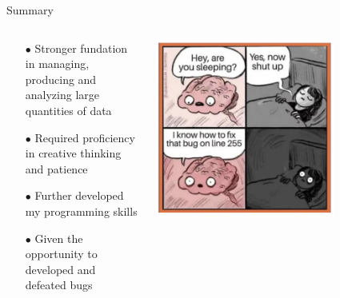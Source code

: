 \documentclass[aspectratio=169]{beamer}
\begin{document}
\begin{frame}{Summary}
    \begin{columns}
        \begin{column}{0.5\textwidth}
            \begin{itemize}
              \item[$\bullet$] Stronger fundation in managing, producing and analyzing large quantities of data
              \item[$\bullet$] Required proficiency in creative thinking and patience
              \item[$\bullet$] Further developed my programming skills
              \item[$\bullet$] Given the opportunity to developed and defeated bugs
            \end{itemize}
        \end{column}
        \begin{column}{0.5\textwidth}
            \includegraphics[width=0.7\textwidth]{figures/bugs.png}
        \end{column}
    \end{columns}
\end{frame}
\end{document}
